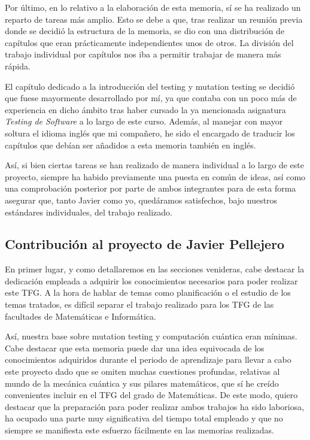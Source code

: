 Por último, en lo relativo a la elaboración de esta memoria, sí se ha realizado un reparto de tareas más amplio. Esto se debe a que, tras realizar un reunión previa donde se decidió la estructura de la memoria, se dio con una distribución de capítulos que eran prácticamente independientes unos de otros. La división del trabajo individual por capítulos nos iba a permitir trabajar de manera más rápida. 

El capítulo dedicado a la introducción del testing y mutation testing se decidió que fuese mayormente desarrollado por mí, ya que contaba con un poco más de experiencia en dicho ámbito tras haber cursado la ya mencionada asignatura \textit{Testing de Software} a lo largo de este curso. Además, al manejar con mayor soltura el idioma inglés que mi compañero, he sido el encargado de traducir los capítulos que debían ser añadidos a esta memoria también en inglés.

Así, si bien ciertas tareas se han realizado de manera individual a lo largo de este proyecto, siempre ha habido previamente una puesta en común de ideas, así como una comprobación posterior por parte de ambos integrantes para de esta forma asegurar que, tanto Javier como yo, quedáramos satisfechos, bajo nuestros estándares individuales, del trabajo realizado.

\subsection{Contribución al proyecto de Javier Pellejero}

En primer lugar, y como detallaremos en las secciones venideras, cabe destacar la dedicación empleada a adquirir los conocimientos necesarios para poder realizar este TFG. A la hora de hablar de temas como planificación o el estudio de los temas tratados, es difícil separar el trabajo realizado para los TFG de las facultades de Matemáticas e Informática.

Así, nuestra base sobre mutation testing y computación cuántica eran mínimas. Cabe destacar que esta memoria puede dar una idea equivocada de los conocimientos adquiridos durante el periodo de aprendizaje para llevar a cabo este proyecto dado que se omiten muchas cuestiones profundas, relativas al mundo de la mecánica cuántica y sus pilares matemáticos, que sí he creído convenientes incluir en el TFG del grado de Matemáticas. De este modo, quiero destacar que la preparación para poder realizar ambos trabajos ha sido laboriosa, ha ocupado una parte muy significativa del tiempo total empleado y que no siempre se manifiesta este esfuerzo fácilmente en las memorias realizadas.


